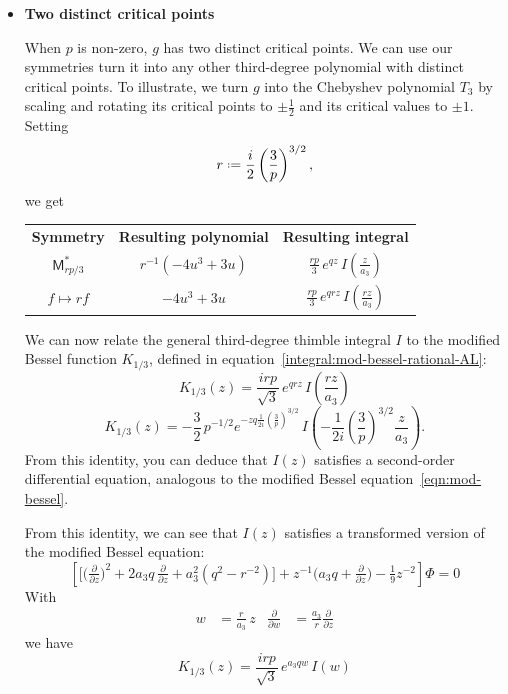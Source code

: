 \documentclass{article}
\newcommand*{\defeq}{\mathrel{\vcenter{\baselineskip0.5ex \lineskiplimit0pt
                     \hbox{\scriptsize.}\hbox{\scriptsize.}}}%
                     =}
\theoremstyle{definition}
\theoremstyle{plain}
\newenvironment{verify}{\color{ForestGreen}}{\color{black}}
\newenvironment{todo}{\color{Coral}}{\color{black}}
\begin{document}
\begin{itemize}
\item[] \textbf{Two distinct critical points}

When $p$ is non-zero, $g$ has two distinct critical points. We can use our symmetries turn it into any other third-degree polynomial with distinct critical points. To illustrate, we turn $g$ into the Chebyshev polynomial $T_3$ by scaling and rotating its critical points to $\pm\tfrac{1}{2}$ and its critical values to $\pm 1$. Setting
\[ r \defeq \frac{i}{2} \left(\frac{3}{p}\right)^{3/2}, \]
we get
\begin{center}
\begin{tabular}{c|c|c}
\textbf{Symmetry} & \textbf{Resulting polynomial} & \textbf{Resulting integral} \\[2mm]
$\displaystyle \mathsf{M}_{rp/3}^*$ & $\displaystyle r^{-1} \left(-4u^3 + 3u\right)$ & $\displaystyle \frac{rp}{3}\,e^{qz}\,I\left(\frac{z}{a_3}\right)$ \\[5mm]
$\displaystyle f \mapsto rf$ & $\displaystyle -4u^3 + 3u$ & $\displaystyle \frac{rp}{3}\,e^{qrz}\,I\left(\frac{rz}{a_3}\right)$ \\[5mm]
\end{tabular}
\end{center}

We can now relate the general third-degree thimble integral $I$ to the modified Bessel function $K_{1/3}$, defined in equation~\eqref{integral:mod-bessel-rational-AL}:
\begin{equation}
K_{1/3}(z) = \frac{irp}{\sqrt{3}}\,e^{qrz}\,I\left(\frac{rz}{a_3}\right)
\end{equation}
\begin{verify}
\begin{equation}
K_{1/3}(z) = -\frac{3}{2}\,p^{-1/2} e^{-zq \frac{1}{2i} \left(\frac{3}{p}\right)^{3/2}}\,I\left(-\frac{1}{2i} \left(\frac{3}{p}\right)^{3/2} \frac{z}{a_3}\right).
\end{equation}
\end{verify}
From this identity, you can deduce that $I(z)$ satisfies a second-order differential equation, analogous to the modified Bessel equation~\eqref{eqn:mod-bessel}.
\begin{todo}\par
From this identity, we can see that $I(z)$ satisfies a transformed version of the modified Bessel equation:
\[ \left[ \big[\big(\tfrac{\partial}{\partial z}\big)^2 + 2a_3 q\,\tfrac{\partial}{\partial z} + a_3^2 (q^2 - r^{-2})\big] + z^{-1} \big(a_3 q + \tfrac{\partial}{\partial z}\big) - \tfrac{1}{9} z^{-2} \right] \Phi = 0 \]
\begin{verify}
With
\begin{align*}
w & = \frac{r}{a_3}\,z &
\frac{\partial}{\partial w} & = \frac{a_3}{r} \frac{\partial}{\partial z}
\end{align*}
we have
\[ K_{1/3}(z) = \frac{irp}{\sqrt{3}}\,e^{a_3 qw}\,I(w) \]


\end{verify}
\end{todo}
\end{itemize}
\end{document}
